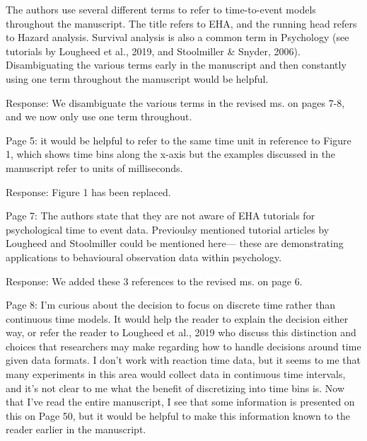 \documentclass[
]{article}
\renewenvironment{quote}{\begin{leftbar}}{\end{leftbar}}
\begin{document}
\begin{quote}
The authors use several different terms to refer to time-to-event models
throughout the manuscript. The title refers to EHA, and the running head
refers to Hazard analysis. Survival analysis is also a common term in
Psychology (see tutorials by Lougheed et al., 2019, and Stoolmiller \&
Snyder, 2006). Disambiguating the various terms early in the manuscript
and then constantly using one term throughout the manuscript would be
helpful.
\end{quote}

Response: We disambiguate the various terms in the revised ms. on pages
7-8, and we now only use one term throughout.

\begin{quote}
Page 5: it would be helpful to refer to the same time unit in reference
to Figure 1, which shows time bins along the x-axis but the examples
discussed in the manuscript refer to units of milliseconds.
\end{quote}

Response: Figure 1 has been replaced.

\begin{quote}
Page 7: The authors state that they are not aware of EHA tutorials for
psychological time to event data. Previoulsy mentioned tutorial articles
by Lougheed and Stoolmiller could be mentioned here--- these are
demonstrating applications to behavioural observation data within
psychology.
\end{quote}

Response: We added these 3 references to the revised ms. on page 6.

\begin{quote}
Page 8: I'm curious about the decision to focus on discrete time rather
than continuous time models. It would help the reader to explain the
decision either way, or refer the reader to Lougheed et al., 2019 who
discuss this distinction and choices that researchers may make regarding
how to handle decisions around time given data formats. I don't work
with reaction time data, but it seems to me that many experiments in
this area would collect data in continuous time intervals, and it's not
clear to me what the benefit of discretizing into time bins is. Now that
I've read the entire manuscript, I see that some information is
presented on this on Page 50, but it would be helpful to make this
information known to the reader earlier in the manuscript.
\end{quote}
\end{document}
